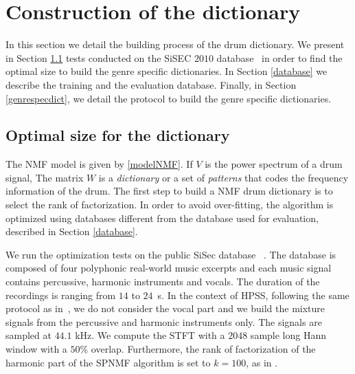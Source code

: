 \documentclass{article}
\begin{document}
\section{Construction of the dictionary}\label{ConstrucDict}

In this section we detail the building process of the drum dictionary. We present in Section \ref{optimalsize} tests conducted on the SiSEC $2010$ database~\cite{SiSec10} in order to find the optimal size to build the genre specific dictionaries. In Section \ref{database} we describe the training and the evaluation database. Finally, in Section \ref{genrespecdict}, we detail the protocol to build the genre specific dictionaries. 

\subsection{Optimal size for the dictionary}\label{optimalsize}


The NMF model is given by \eqref{modelNMF}. If $V$ is the power spectrum of a drum signal, The matrix $W$ is a {\em dictionary} or a set of {\em patterns} that codes the frequency information of the drum. The first step to build a NMF drum dictionary is to select the rank of factorization. In order to avoid over-fitting, the algorithm is optimized using databases different from the database used for evaluation, described in Section \ref{database}. 

We run the optimization tests on the public SiSec database ~\cite{SiSec10}. The database is composed of four polyphonic real-world music excerpts and each music signal contains percussive, harmonic instruments and vocals. The duration of the recordings is ranging from $14$ to $24$~s. In the context of HPSS, following the same protocol as in~\cite{canadas2014percussive}, we do not consider the vocal part and we build the mixture signals from the percussive and harmonic instruments only. The signals are sampled at $44.1$ kHz. We compute the STFT with a $2048$ sample long Hann window with a $50\%$ overlap. Furthermore, the rank of factorization of the harmonic part of the SPNMF algorithm is set to $k=100$, as in \cite{larocheJournal}.
\end{document}
